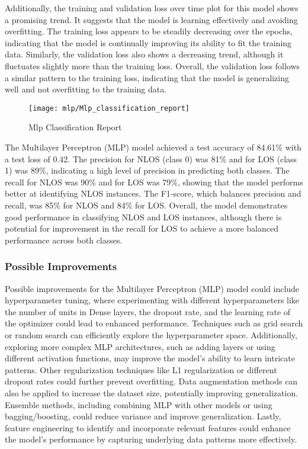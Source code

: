 Additionally, the training and validation loss over time plot for this model shows a promising trend. It suggests that the model is learning effectively and avoiding overfitting. The training loss appears to be steadily decreasing over the epochs, indicating that the model is continually improving its ability to fit the training data. Similarly, the validation loss also shows a decreasing trend, although it fluctuates slightly more than the training loss. Overall, the validation loss follows a similar pattern to the training loss, indicating that the model is generalizing well and not overfitting to the training data.

\begin{figure}[H] 
	\centering
	\texttt{[image: mlp/Mlp\_classification\_report]}
	\caption{Mlp Classification Report}\label{fig:mlp_classification_report}
\end{figure}

The Multilayer Perceptron (MLP) model achieved a test accuracy of 84.61\% with a test loss of 0.42. The precision for NLOS (class 0) was 81\% and for LOS (class 1) was 89\%, indicating a high level of precision in predicting both classes. The recall for NLOS was 90\% and for LOS was 79\%, showing that the model performs better at identifying NLOS instances. The F1-score, which balances precision and recall, was 85\% for NLOS and 84\% for LOS. Overall, the model demonstrates good performance in classifying NLOS and LOS instances, although there is potential for improvement in the recall for LOS to achieve a more balanced performance across both classes.

\subsubsection{Possible Improvements}

Possible improvements for the Multilayer Perceptron (MLP) model could include hyperparameter tuning, where experimenting with different hyperparameters like the number of units in Dense layers, the dropout rate, and the learning rate of the optimizer could lead to enhanced performance. Techniques such as grid search or random search can efficiently explore the hyperparameter space. Additionally, exploring more complex MLP architectures, such as adding layers or using different activation functions, may improve the model's ability to learn intricate patterns. Other regularization techniques like L1 regularization or different dropout rates could further prevent overfitting. Data augmentation methods can also be applied to increase the dataset size, potentially improving generalization. Ensemble methods, including combining MLP with other models or using bagging/boosting, could reduce variance and improve generalization. Lastly, feature engineering to identify and incorporate relevant features could enhance the model's performance by capturing underlying data patterns more effectively.

